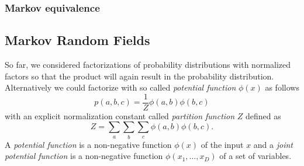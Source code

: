 \subsubsection{Markov equivalence}
%
%
%
%
\subsection{Markov Random Fields}
\begin{figure}[H]
\centering{}
\end{figure}
So far, we considered factorizations of probability distributions with normalized factors so that the product will again result in the probability distribution. %
Alternatively we could factorize with so called \emph{potential function} \ensuremath{\phi(x)} as follows %
\begin{equation}
p(a,b,c) = \frac{1}{Z} \phi(a,b) \phi(b,c)
\label{eq:alternative_factorization}
\end{equation}%
with an explicit normalization constant called \emph{partition function} \ensuremath{Z} defined as %
\begin{equation}
Z = \sum_{a}\sum_{b}\sum_{c} \phi(a,b) \phi(b,c).
\label{eq:partition_function}
\end{equation}%
A \emph{potential function} is a non-negative function \ensuremath{\phi(x)} of the input \ensuremath{x} and a \emph{joint potential function} is a non-negative function \ensuremath{\phi(x_1,\ldots,x_D)} of a set of variables. %
\\[.3cm]%
